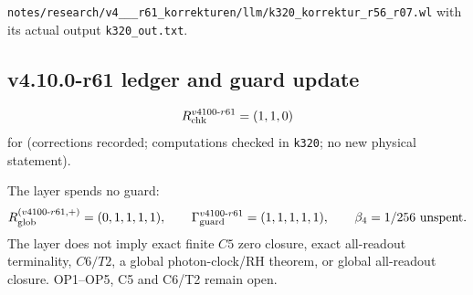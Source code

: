 {\raggedright
\texttt{notes/\allowbreak research/\allowbreak v4\_\_\_\allowbreak r61\_\allowbreak korrekturen/\allowbreak llm/\allowbreak k320\_\allowbreak korrektur\_\allowbreak r56\_\allowbreak r07.wl}
with its actual output \texttt{k320\_\allowbreak out.txt}.
\par}

\subsection*{v4.10.0-r61 ledger and guard update}
\label{subsec:v4100-r61-ledger-guard}

\[
R_{\rm chk}^{v4100\text{-}r61}=(1,1,0)
\]
for (corrections recorded; computations checked in \texttt{k320}; no new physical statement).

The layer spends no guard:
\[
R_{\rm glob}^{(v4100\text{-}r61,+)}=(0,1,1,1,1),
\qquad
\Gamma_{\rm guard}^{v4100\text{-}r61}=(1,1,1,1,1),
\qquad
\beta_4=1/256\ \text{unspent}.
\]
The layer does not imply exact finite \(C5\) zero closure, exact all-readout terminality, \(C6/T2\), a global photon-clock/RH theorem,
or global all-readout closure.  OP1--OP5, C5 and C6/T2 remain open.

